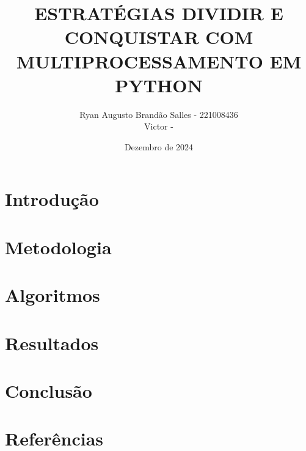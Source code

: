 \documentclass{article}
\title{ESTRATÉGIAS DIVIDIR E CONQUISTAR COM MULTIPROCESSAMENTO EM PYTHON}
\author{
    Ryan Augusto Brandão Salles - 221008436\\
    Victor - 
}
\date{Dezembro de 2024}
\begin{document}
\maketitle

\section{Introdução}

\section{Metodologia}

\section{Algoritmos}

\section{Resultados}

\section{Conclusão}

\section{Referências}
\end{document}
